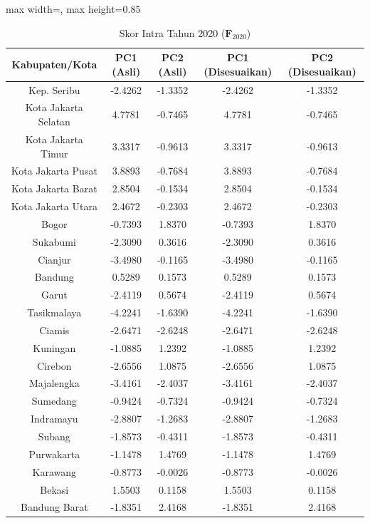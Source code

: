 \begin{table}[H]
\centering
\caption{Skor Intra Tahun 2020 ($\mathbf{F}_{2020}$)} \label{tab:appskor_intra_2020}
\begin{adjustbox}{max width=\textwidth, max height=0.85\textheight}
\begin{tabular}{|c|c|c|c|c|}
\hline
\textbf{Kabupaten/Kota} & \textbf{PC1 (Asli)} & \textbf{PC2 (Asli)} & \textbf{PC1 (Disesuaikan)} & \textbf{PC2 (Disesuaikan)} \\
\hline
Kep. Seribu & -2.4262 & -1.3352 & -2.4262 & -1.3352 \\
Kota Jakarta Selatan & 4.7781 & -0.7465 & 4.7781 & -0.7465 \\
Kota Jakarta Timur & 3.3317 & -0.9613 & 3.3317 & -0.9613 \\
Kota Jakarta Pusat & 3.8893 & -0.7684 & 3.8893 & -0.7684 \\
Kota Jakarta Barat & 2.8504 & -0.1534 & 2.8504 & -0.1534 \\
Kota Jakarta Utara & 2.4672 & -0.2303 & 2.4672 & -0.2303 \\
Bogor & -0.7393 & 1.8370 & -0.7393 & 1.8370 \\
Sukabumi & -2.3090 & 0.3616 & -2.3090 & 0.3616 \\
Cianjur & -3.4980 & -0.1165 & -3.4980 & -0.1165 \\
Bandung & 0.5289 & 0.1573 & 0.5289 & 0.1573 \\
Garut & -2.4119 & 0.5674 & -2.4119 & 0.5674 \\
Tasikmalaya & -4.2241 & -1.6390 & -4.2241 & -1.6390 \\
Ciamis & -2.6471 & -2.6248 & -2.6471 & -2.6248 \\
Kuningan & -1.0885 & 1.2392 & -1.0885 & 1.2392 \\
Cirebon & -2.6556 & 1.0875 & -2.6556 & 1.0875 \\
Majalengka & -3.4161 & -2.4037 & -3.4161 & -2.4037 \\
Sumedang & -0.9424 & -0.7324 & -0.9424 & -0.7324 \\
Indramayu & -2.8807 & -1.2683 & -2.8807 & -1.2683 \\
Subang & -1.8573 & -0.4311 & -1.8573 & -0.4311 \\
Purwakarta & -1.1478 & 1.4769 & -1.1478 & 1.4769 \\
Karawang & -0.8773 & -0.0026 & -0.8773 & -0.0026 \\
Bekasi & 1.5503 & 0.1158 & 1.5503 & 0.1158 \\
Bandung Barat & -1.8351 & 2.4168 & -1.8351 & 2.4168 \\

\end{tabular}
\end{adjustbox}
\end{table}
